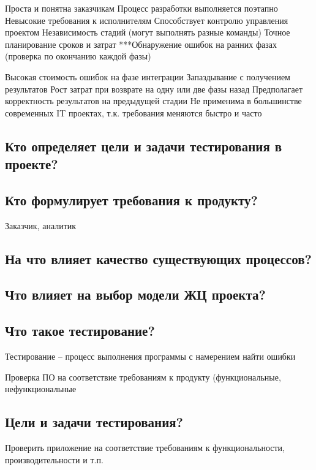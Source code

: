 Проста и понятна заказчикам
Процесс разработки выполняется поэтапно
Невысокие требования к исполнителям
Способствует контролю управления проектом
Независимость стадий (могут выполнять разные команды)
Точное планирование сроков и затрат
***Обнаружение ошибок на ранних фазах (проверка по окончанию каждой фазы)

Высокая стоимость ошибок на фазе интеграции
Запаздывание с получением результатов
Рост затрат при возврате на одну или две фазы назад
Предполагает корректность результатов на предыдущей стадии
Не применима в большинстве современных  IT проектах, т.к. требования меняются
быстро и часто

\subsection{Кто определяет цели и задачи тестирования в проекте?}

\subsection{Кто формулирует требования к продукту?}

Заказчик, аналитик

\subsection{На что влияет качество существующих процессов?}

\subsection{Что влияет на выбор модели ЖЦ проекта?}



\subsection{Что такое тестирование?}

Тестирование – процесс выполнения программы с намерением найти ошибки

Проверка ПО на соответствие требованиям к продукту (функциональные,
нефункциональные

\subsection{Цели и задачи тестирования?}

Проверить приложение на соответствие требованиям к функциональности,
производительности и т.п.

